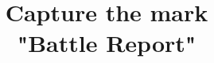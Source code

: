 \documentclass[10pt,handout]{beamer}
\title{Capture the mark\\"Battle Report"}
\author[Group nonsonoprompt]{%
	\texorpdfstring{%
		\begin{columns}
			\column{.22\linewidth}
			\centering
			Paolo Chistè
			\column{.27\linewidth}
			\centering
			Claudio Facchinetti
			\column{.25\linewidth}
			\centering
			Matteo Franzil
			\column{.23\linewidth}
			\centering
			Tommaso Fanelli
		\end{columns}
	}{Group nonsonoprompt}
}
\institute{University of Trento}
\begin{document}
\begin{frame}
\maketitle
\end{frame}

\end{document}
